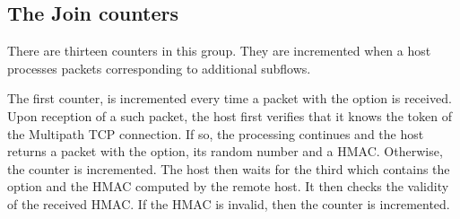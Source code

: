 \documentclass[letterpaper,10pt,english]{sphinxmanual}
\begin{document}
\begin{sphinxVerbatim}[commandchars=\\\{\}]
\end{sphinxVerbatim}


\subsection{The Join counters}
\label{\detokenize{mptcp-linux:the-join-counters}}
\sphinxAtStartPar
There are thirteen counters in this group. They are incremented when a host
processes  packets corresponding to additional subflows.

\sphinxAtStartPar
The first counter,  is incremented every time a
 packet with the  option is received. Upon reception
of a such packet, the host first verifies that it knows the token of
the Multipath TCP connection. If so, the processing continues and
the host returns a  packet with the  option, its
random number and a HMAC. Otherwise, the 
counter is incremented. The host then waits for the third 
which contains the  option and the HMAC computed by
the remote host. It then checks the validity of the received HMAC. If
the HMAC is invalid, then the  counter
is incremented.
\end{document}

